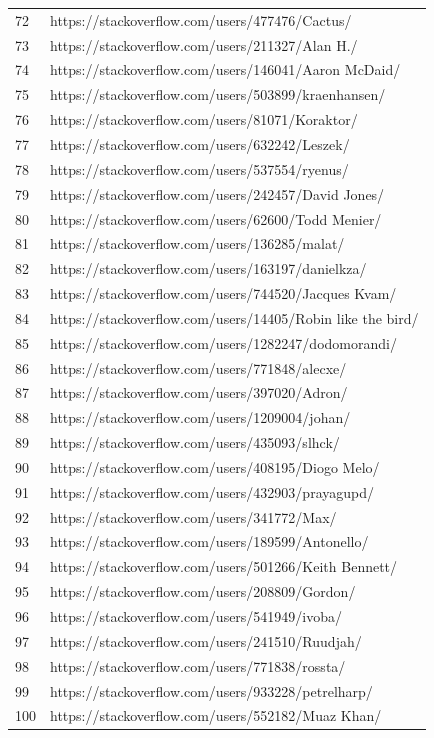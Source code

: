 \begin{center}
\begin{longtable}{|p{1.5cm}|p{12.5cm}|}
        72 & https://stackoverflow.com/users/477476/Cactus/ \\
        73 & https://stackoverflow.com/users/211327/Alan H./ \\
        74 & https://stackoverflow.com/users/146041/Aaron McDaid/ \\
        75 & https://stackoverflow.com/users/503899/kraenhansen/ \\
        76 & https://stackoverflow.com/users/81071/Koraktor/ \\
        77 & https://stackoverflow.com/users/632242/Leszek/ \\
        78 & https://stackoverflow.com/users/537554/ryenus/ \\
        79 & https://stackoverflow.com/users/242457/David Jones/ \\
        80 & https://stackoverflow.com/users/62600/Todd Menier/ \\
        81 & https://stackoverflow.com/users/136285/malat/ \\
        82 & https://stackoverflow.com/users/163197/danielkza/ \\
        83 & https://stackoverflow.com/users/744520/Jacques Kvam/ \\
        84 & https://stackoverflow.com/users/14405/Robin like the bird/ \\
        85 & https://stackoverflow.com/users/1282247/dodomorandi/ \\
        86 & https://stackoverflow.com/users/771848/alecxe/ \\
        87 & https://stackoverflow.com/users/397020/Adron/ \\
        88 & https://stackoverflow.com/users/1209004/johan/ \\
        89 & https://stackoverflow.com/users/435093/slhck/ \\
        90 & https://stackoverflow.com/users/408195/Diogo Melo/ \\
        91 & https://stackoverflow.com/users/432903/prayagupd/ \\
        92 & https://stackoverflow.com/users/341772/Max/ \\
        93 & https://stackoverflow.com/users/189599/Antonello/ \\
        94 & https://stackoverflow.com/users/501266/Keith Bennett/ \\
        95 & https://stackoverflow.com/users/208809/Gordon/ \\
        96 & https://stackoverflow.com/users/541949/ivoba/ \\
        97 & https://stackoverflow.com/users/241510/Ruudjah/ \\
        98 & https://stackoverflow.com/users/771838/rossta/ \\
        99 & https://stackoverflow.com/users/933228/petrelharp/ \\
        100 & https://stackoverflow.com/users/552182/Muaz Khan/ \\
        \hline
        \end{longtable}
        \end{center}
        
